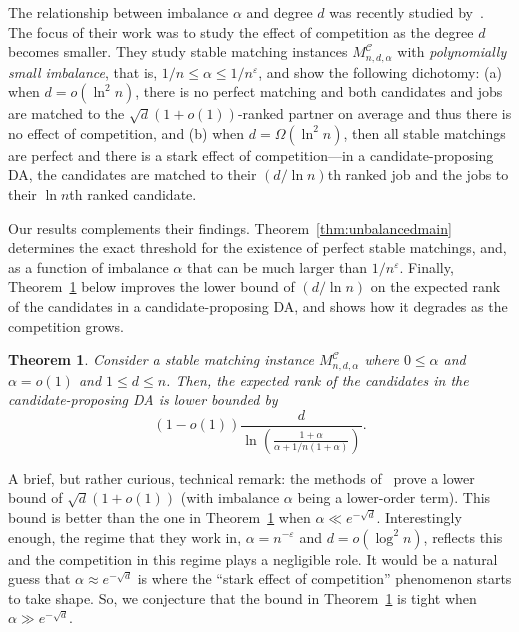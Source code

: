 \documentclass[11pt]{amsart}
\newtheorem{theorem}{Theorem}
\renewcommand{\epsilon}{\varepsilon}
\newcommand{\cal}[1]{\mathcal{#1}}
\begin{document}
The relationship between imbalance $\alpha$ and degree $d$ was recently studied by~\cite{kanoria2021matching}.  The focus of their work was to study 
the effect of competition as the degree $d$ becomes smaller.  They study stable matching instances $M_{n, d, \alpha}^{\cal{C}}$ with \emph{polynomially small imbalance}, that is, $1/n \leq \alpha \leq 1/n^{\epsilon}$, and show the following dichotomy:  (a) when $d = o(\ln ^2 n)$, there is no perfect matching and both candidates and jobs are matched to the $\sqrt{d}(1+ o(1))$-ranked partner on average and thus there is no effect of competition, and (b) when $d = \Omega(\ln^2 n)$, then all stable matchings are perfect and there is a stark effect of competition---in a candidate-proposing DA, the candidates are matched to their $(d/\ln n)$th ranked job and the jobs to their $\ln n$th ranked candidate.  


Our results complements their findings. 
 Theorem~\ref{thm:unbalancedmain} determines the exact threshold for the existence of perfect stable matchings, and, as a function of imbalance $\alpha$ that can be much larger than $1/n^{\epsilon}$.  Finally, Theorem~\ref{thm:ranklower} below improves the lower bound of $(d/\ln n)$ on the expected rank of the candidates in a candidate-proposing DA, and shows how it degrades as the competition grows.
 
 \begin{theorem}\label{thm:ranklower}
Consider a stable matching instance $M_{n, d, \alpha}^{\mathcal{C}}$ where $0 \leq \alpha$ and $\alpha = o(1)$ and $1 \leq d \leq n$. Then, the expected rank of the candidates in the candidate-proposing DA is lower bounded by 
\[(1-o(1)) \frac{d}{\ln \left( \frac{1+\alpha}{\alpha + 1/n(1+\alpha)}\right)}.\]
\end{theorem}

A brief, but rather curious, technical remark: the methods of~\cite{kanoria2021matching} prove a lower bound of $\sqrt{d}(1+o(1))$ (with imbalance $\alpha$ being a lower-order term). This bound is better than the one in Theorem~\ref{thm:ranklower} when $\alpha \ll e^{-\sqrt{d}}$. Interestingly enough, the regime that they work in, $\alpha = n^{-\epsilon}$ and $d = o(\log^2 n)$, reflects this and the competition in this regime plays a negligible role. It would be a natural guess that $\alpha \approx e^{-\sqrt{d}}$ is where the ``stark effect of competition'' phenomenon starts to take shape.  So, we conjecture that the bound in Theorem~\ref{thm:ranklower} is tight when $\alpha \gg e^{-\sqrt{d}}$.
\end{document}
